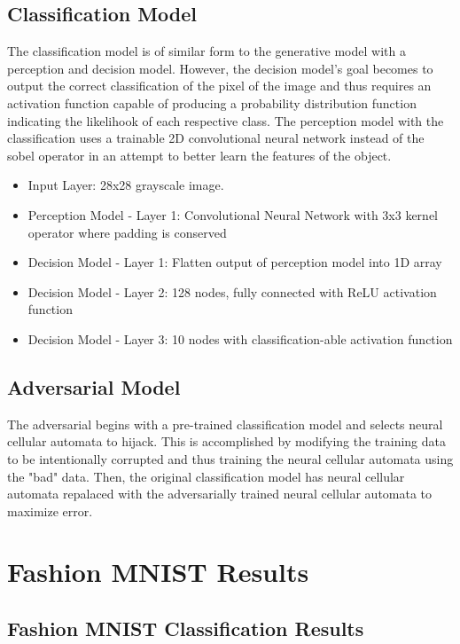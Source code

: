 \documentclass[conference]{IEEEtran}
\begin{document}
\subsection{Classification Model}

The classification model is of similar form to the generative model with a perception and decision model. However, the decision model's goal becomes to output the correct classification of the pixel of the image and thus requires an activation function capable of producing a probability distribution function indicating the likelihook of each respective class. The perception model with the classification uses a trainable 2D convolutional neural network instead of the sobel operator in an attempt to better learn the features of the object.

\begin{itemize}
    \item Input Layer: 28x28 grayscale image.
    \item Perception Model - Layer 1: Convolutional Neural Network with 3x3 kernel operator where padding is conserved
    \item Decision Model - Layer 1: Flatten output of perception model into 1D array
    \item Decision Model - Layer 2: 128 nodes, fully connected with ReLU activation function
    \item Decision Model - Layer 3: 10 nodes with classification-able activation function 
\end{itemize}

\subsection{Adversarial Model} 

The adversarial begins with a pre-trained classification model and selects neural cellular automata to hijack. This is accomplished by modifying the training data to be intentionally corrupted and thus training the neural cellular automata using the "bad" data. Then, the original classification model has neural cellular automata repalaced with the adversarially trained neural cellular automata to maximize error. 

\section{Fashion MNIST Results}

\subsection{Fashion MNIST Classification Results}
\end{document}
